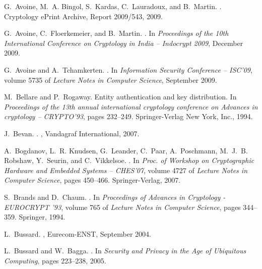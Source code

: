\documentclass{article}
\begin{document}
\begin{thebibliography}{99}

G.~Avoine, M.~A. Bingol, S.~Kardas, C.~Lauradoux, and B.~Martin.
.
\newblock Cryptology ePrint Archive, Report 2009/543, 2009.

G.~Avoine, C.~Floerkemeier, and B.~Martin.
.
\newblock In {\em Proceedings of the 10th International Conference on
  Cryptology in India -- Indocrypt 2009}, December 2009.

G.~Avoine and A.~Tchamkerten.
.
\newblock In {\em Information Security Conference -- ISC'09}, volume 5735 of
  {\em Lecture Notes in Computer Science}, September 2009.

M.~Bellare and P.~Rogaway.
\newblock Entity authentication and key distribution.
\newblock In {\em Proceedings of the 13th annual international cryptology
  conference on Advances in cryptology -- CRYPTO'93}, pages 232--249.
  Springer-Verlag New York, Inc., 1994.

J.~Bevan.
.
, Vandagraf International, 2007.

A.~Bogdanov, L.~R. Knudsen, G.~Leander, C.~Paar, A.~Poschmann, M.~J.~B.
  Robshaw, Y.~Seurin, and C.~Vikkelsoe.
.
\newblock In {\em Proc. of Workshop on Cryptographic Hardware and Embedded
  Systems -- CHES'07}, volume 4727 of {\em Lecture Notes in Computer Science},
  pages 450--466. Springer-Verlag, 2007.

S.~Brands and D.~Chaum.
.
\newblock In {\em {Proceedings of Advances in Cryptology - EUROCRYPT '93}},
  volume 765 of {\em Lecture Notes in Computer Science}, pages 344--359.
  Springer, 1994.

L.~Bussard.
, Eurecom-ENST, September 2004.

L.~Bussard and W.~Bagga.
.
\newblock In {\em Security and Privacy in the Age of Ubiquitous Computing},
  pages 223--238, 2005.


\end{thebibliography}
\end{document}

